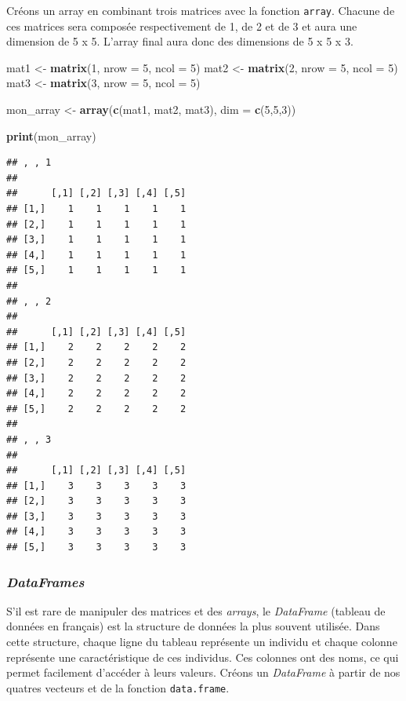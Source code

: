 \documentclass[
  11pt,
  french,
]{book}
\makeatletter
\newenvironment{Shaded}{\begin{snugshade}}{\end{snugshade}}
\newcommand{\DataTypeTok}[1]{\textcolor[rgb]{0.13,0.29,0.53}{#1}}
\newcommand{\DecValTok}[1]{\textcolor[rgb]{0.00,0.00,0.81}{#1}}
\newcommand{\KeywordTok}[1]{\textcolor[rgb]{0.13,0.29,0.53}{\textbf{#1}}}
\newcommand{\NormalTok}[1]{#1}
\newcommand{\StringTok}[1]{\textcolor[rgb]{0.31,0.60,0.02}{#1}}
\newenvironment{kframe}{%
\medskip{}
\setlength{\fboxsep}{.8em}
 \def\at@end@of@kframe{}%
 \ifinner\ifhmode%
  \def\at@end@of@kframe{\end{minipage}}%
  \begin{minipage}{\columnwidth}%
 \fi\fi%
 \def\FrameCommand##1{\hskip\@totalleftmargin \hskip-\fboxsep
 \colorbox{shadecolor}{##1}\hskip-\fboxsep
     \hskip-\linewidth \hskip-\@totalleftmargin \hskip\columnwidth}%
 \MakeFramed {\advance\hsize-\width
   \@totalleftmargin\z@ \linewidth\hsize
   \@setminipage}}%
 {\par\unskip\endMakeFramed%
 \at@end@of@kframe}
\renewenvironment{Shaded}{\begin{kframe}}{\end{kframe}}
\makeatother
\begin{document}
Créons un array en combinant trois matrices avec la fonction \texttt{array}. Chacune de ces matrices sera composée respectivement de 1, de 2 et de 3 et aura une dimension de 5 x 5. L'array final aura donc des dimensions de 5 x 5 x 3.

\begin{Shaded}
\begin{Highlighting}[]
\NormalTok{mat1 <-}\StringTok{ }\KeywordTok{matrix}\NormalTok{(}\DecValTok{1}\NormalTok{, }\DataTypeTok{nrow =} \DecValTok{5}\NormalTok{, }\DataTypeTok{ncol =} \DecValTok{5}\NormalTok{)}
\NormalTok{mat2 <-}\StringTok{ }\KeywordTok{matrix}\NormalTok{(}\DecValTok{2}\NormalTok{, }\DataTypeTok{nrow =} \DecValTok{5}\NormalTok{, }\DataTypeTok{ncol =} \DecValTok{5}\NormalTok{)}
\NormalTok{mat3 <-}\StringTok{ }\KeywordTok{matrix}\NormalTok{(}\DecValTok{3}\NormalTok{, }\DataTypeTok{nrow =} \DecValTok{5}\NormalTok{, }\DataTypeTok{ncol =} \DecValTok{5}\NormalTok{)}

\NormalTok{mon_array <-}\StringTok{ }\KeywordTok{array}\NormalTok{(}\KeywordTok{c}\NormalTok{(mat1, mat2, mat3), }\DataTypeTok{dim =} \KeywordTok{c}\NormalTok{(}\DecValTok{5}\NormalTok{,}\DecValTok{5}\NormalTok{,}\DecValTok{3}\NormalTok{))}

\KeywordTok{print}\NormalTok{(mon_array)}
\end{Highlighting}
\end{Shaded}

\begin{verbatim}
## , , 1
## 
##      [,1] [,2] [,3] [,4] [,5]
## [1,]    1    1    1    1    1
## [2,]    1    1    1    1    1
## [3,]    1    1    1    1    1
## [4,]    1    1    1    1    1
## [5,]    1    1    1    1    1
## 
## , , 2
## 
##      [,1] [,2] [,3] [,4] [,5]
## [1,]    2    2    2    2    2
## [2,]    2    2    2    2    2
## [3,]    2    2    2    2    2
## [4,]    2    2    2    2    2
## [5,]    2    2    2    2    2
## 
## , , 3
## 
##      [,1] [,2] [,3] [,4] [,5]
## [1,]    3    3    3    3    3
## [2,]    3    3    3    3    3
## [3,]    3    3    3    3    3
## [4,]    3    3    3    3    3
## [5,]    3    3    3    3    3
\end{verbatim}

\hypertarget{sect01364}{%
\subsubsection{\texorpdfstring{\emph{DataFrames}}{DataFrames}}\label{sect01364}}

S'il est rare de manipuler des matrices et des \emph{arrays}, le \emph{DataFrame} (tableau de données en français) est la structure de données la plus souvent utilisée. Dans cette structure, chaque ligne du tableau représente un individu et chaque colonne représente une caractéristique de ces individus. Ces colonnes ont des noms, ce qui permet facilement d'accéder à leurs valeurs. Créons un \emph{DataFrame} à partir de nos quatres vecteurs et de la fonction \texttt{data.frame}.
\end{document}
